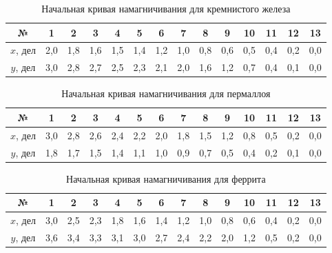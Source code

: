 \documentclass[a4paper]{article}
\theoremstyle{definition}
\theoremstyle{remark}
\begin{document}
\newpage
  	
  		\begin{table}[h!]
  		\caption{Начальная кривая намагничивания для кремнистого железа}
  		\begin{center}
  			\begin{tabular}{|c|c|c|c|c|c|c|c|c|c|c|c|c|c|} 
  				\hline 
  				№ &  1 &  2 & 3 & 4 & 5 &  6 &  7 & 8 & 9 & 10  &  11 &  12 & 13  \\ 	\hline
  				
  			 $ x $, дел & 2,0 & 1,8 & 1,6 & 1,5 & 1,4 & 1,2 & 1,0 & 0,8 & 0,6 & 0,5 & 0,4 & 0,2 & 0,0 \\
  				 $ y $, дел & 3,0 & 2,8 & 2,7 & 2,5 & 2,3 & 2,1 & 2,0 & 1,6 & 1,2 & 0,7 & 0,4 & 0,1 & 0,0 \\
  				\hline
  				
  			\end{tabular}
  		\end{center}
  	\end{table}

		\begin{table}[h!]
		\caption{Начальная кривая намагничивания для пермаллоя}
		\begin{center}
			\begin{tabular}{|c|c|c|c|c|c|c|c|c|c|c|c|c|c|} 
				\hline 
				№ &  1 &  2 & 3 & 4 & 5 &  6 &  7 & 8 & 9 & 10  &  11 &  12 &13   \\ 	\hline
				
			$ x $, дел & 3,0 & 2,8 & 2,6 & 2,4 & 2,2 & 2,0 & 1,8 & 1,5 & 1,2 & 0,8 & 0,5 & 0,2 & 0,0 \\
			 $ y $, дел & 1,8 & 1,7 & 1,5 & 1,4 & 1,1 & 1,0 & 0,9 & 0,7 & 0,5 & 0,4 & 0,2 & 0,1 & 0,0 \\
				\hline
				
			\end{tabular}
		\end{center}
	\end{table}

    \begin{table}[h!]
        \caption{Начальная кривая намагничивания для феррита}
        \begin{center}
            \begin{tabular}{|c|c|c|c|c|c|c|c|c|c|c|c|c|c|} 
                \hline 
                № &  1 &  2 & 3 & 4 & 5 &  6 &  7 & 8 & 9 & 10  &  11 &  12 &13   \\ 	\hline
                
            $ x $, дел &3,0 & 2,5 & 2,3 & 1,8 & 1,6 & 1,4 & 1,2 & 1,0 & 0,8 & 0,6 & 0,4 & 0,2 & 0,0 \\
             $ y $, дел & 3,6 & 3,4 & 3,3 & 3,1 & 3,0 & 2,7 & 2,4 & 2,2 & 2,0 & 1,2 & 0,5 & 0,2 & 0,0 \\
                \hline
                
            \end{tabular}
        \end{center}
    \end{table}
\end{document}
